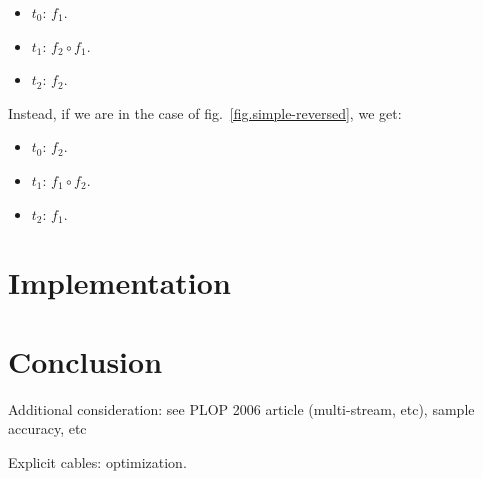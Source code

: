 \documentclass{article}
\begin{document}
    \begin{itemize}
        \item $t_0$: $f_1$.
        \item $t_1$: $f_2 \circ f_1$.
        \item $t_2$: $f_2$. 
    \end{itemize}

    Instead, if we are in the case of fig.~\ref{fig.simple-reversed}, we get: 
    
    \begin{itemize}
        \item $t_0$: $f_2$.
        \item $t_1$: $f_1 \circ f_2$.
        \item $t_2$: $f_1$. 
    \end{itemize}
    
    
    
	\section{Implementation}
    \section{Conclusion}
    Additional consideration: see PLOP 2006 article (multi-stream, etc), sample accuracy, etc
    
    Explicit cables: optimization.
\end{document}
